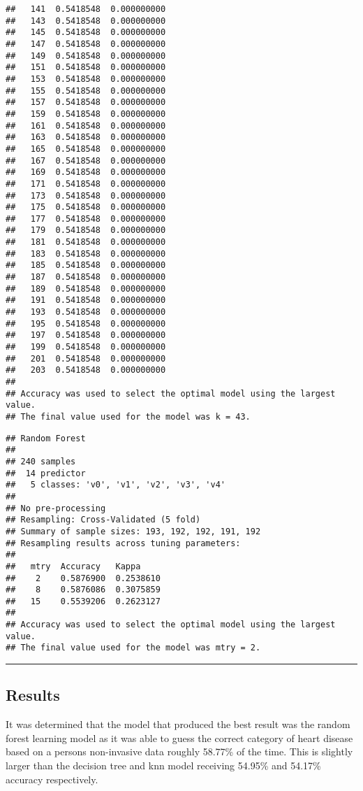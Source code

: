 \documentclass[
]{article}
\begin{document}
\begin{verbatim}
##   141  0.5418548  0.000000000
##   143  0.5418548  0.000000000
##   145  0.5418548  0.000000000
##   147  0.5418548  0.000000000
##   149  0.5418548  0.000000000
##   151  0.5418548  0.000000000
##   153  0.5418548  0.000000000
##   155  0.5418548  0.000000000
##   157  0.5418548  0.000000000
##   159  0.5418548  0.000000000
##   161  0.5418548  0.000000000
##   163  0.5418548  0.000000000
##   165  0.5418548  0.000000000
##   167  0.5418548  0.000000000
##   169  0.5418548  0.000000000
##   171  0.5418548  0.000000000
##   173  0.5418548  0.000000000
##   175  0.5418548  0.000000000
##   177  0.5418548  0.000000000
##   179  0.5418548  0.000000000
##   181  0.5418548  0.000000000
##   183  0.5418548  0.000000000
##   185  0.5418548  0.000000000
##   187  0.5418548  0.000000000
##   189  0.5418548  0.000000000
##   191  0.5418548  0.000000000
##   193  0.5418548  0.000000000
##   195  0.5418548  0.000000000
##   197  0.5418548  0.000000000
##   199  0.5418548  0.000000000
##   201  0.5418548  0.000000000
##   203  0.5418548  0.000000000
## 
## Accuracy was used to select the optimal model using the largest value.
## The final value used for the model was k = 43.
\end{verbatim}

\begin{verbatim}
## Random Forest 
## 
## 240 samples
##  14 predictor
##   5 classes: 'v0', 'v1', 'v2', 'v3', 'v4' 
## 
## No pre-processing
## Resampling: Cross-Validated (5 fold) 
## Summary of sample sizes: 193, 192, 192, 191, 192 
## Resampling results across tuning parameters:
## 
##   mtry  Accuracy   Kappa    
##    2    0.5876900  0.2538610
##    8    0.5876086  0.3075859
##   15    0.5539206  0.2623127
## 
## Accuracy was used to select the optimal model using the largest value.
## The final value used for the model was mtry = 2.
\end{verbatim}

\begin{center}\rule{0.5\linewidth}{0.5pt}\end{center}

\hypertarget{results}{%
\subsection{Results}\label{results}}

It was determined that the model that produced the best result was the
random forest learning model as it was able to guess the correct
category of heart disease based on a persons non-invasive data roughly
58.77\% of the time. This is slightly larger than the decision tree and
knn model receiving 54.95\% and 54.17\% accuracy respectively.
\end{document}
